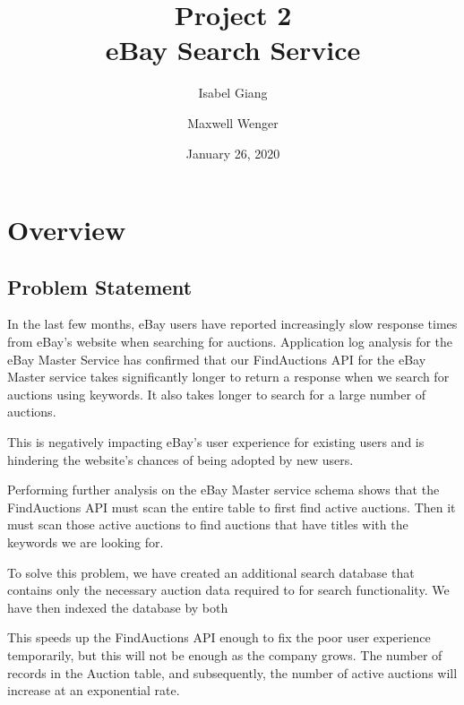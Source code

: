 \documentclass[12pt,a4paper]{article}
\title{Project 2 \\ eBay Search Service}
\author{Isabel Giang}
\author{Maxwell Wenger}
\affil{CSS490 Group Y4}
\date{January 26, 2020}
\begin{document}
\maketitle
\setcounter{tocdepth}{2}
\tableofcontents



\section{Overview}
\subsection{Problem Statement}
In the last few months, eBay users have reported increasingly slow response
times from eBay's website when searching for auctions. Application log analysis
for the eBay Master Service has confirmed that our FindAuctions API for the
eBay Master service takes significantly longer to return a response when we
search for auctions using keywords. It also takes longer to search for a large
number of auctions.

This is negatively impacting eBay's user experience for existing users and is
hindering the website's chances of being adopted by new users.

Performing further analysis on the eBay Master service schema shows that the
FindAuctions API must scan the entire table to first find active auctions. Then
it must scan those active auctions to find auctions that have titles with the
keywords we are looking for.

To solve this problem, we have created an additional search database that
contains only the necessary auction data required to for search functionality.
We have then indexed the database by both 

This speeds up the FindAuctions API enough to fix the poor user experience
temporarily, but this will not be enough as the company grows. The number of
records in the Auction table, and subsequently, the number of active auctions
will increase at an exponential rate.
\end{document}
